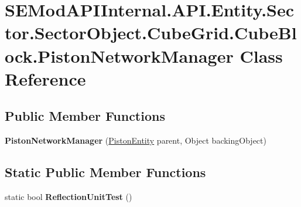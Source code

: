 \hypertarget{class_s_e_mod_a_p_i_internal_1_1_a_p_i_1_1_entity_1_1_sector_1_1_sector_object_1_1_cube_grid_1_125d4a251862e95777b41b851d1ed7712}{}\section{S\+E\+Mod\+A\+P\+I\+Internal.\+A\+P\+I.\+Entity.\+Sector.\+Sector\+Object.\+Cube\+Grid.\+Cube\+Block.\+Piston\+Network\+Manager Class Reference}
\label{class_s_e_mod_a_p_i_internal_1_1_a_p_i_1_1_entity_1_1_sector_1_1_sector_object_1_1_cube_grid_1_125d4a251862e95777b41b851d1ed7712}
\subsection*{Public Member Functions}
\begin{DoxyCompactItemize}
\item 
\hypertarget{class_s_e_mod_a_p_i_internal_1_1_a_p_i_1_1_entity_1_1_sector_1_1_sector_object_1_1_cube_grid_1_125d4a251862e95777b41b851d1ed7712_affb5fb2f7ed81816613123358515a339}{}{\bfseries Piston\+Network\+Manager} (\hyperlink{class_s_e_mod_a_p_i_internal_1_1_a_p_i_1_1_entity_1_1_sector_1_1_sector_object_1_1_cube_grid_1_1_cube_block_1_1_piston_entity}{Piston\+Entity} parent, Object backing\+Object)\label{class_s_e_mod_a_p_i_internal_1_1_a_p_i_1_1_entity_1_1_sector_1_1_sector_object_1_1_cube_grid_1_125d4a251862e95777b41b851d1ed7712_affb5fb2f7ed81816613123358515a339}

\end{DoxyCompactItemize}
\subsection*{Static Public Member Functions}
\begin{DoxyCompactItemize}
\item 
\hypertarget{class_s_e_mod_a_p_i_internal_1_1_a_p_i_1_1_entity_1_1_sector_1_1_sector_object_1_1_cube_grid_1_125d4a251862e95777b41b851d1ed7712_a353d83cb4379a0b7b202f5d074831623}{}static bool {\bfseries Reflection\+Unit\+Test} ()\label{class_s_e_mod_a_p_i_internal_1_1_a_p_i_1_1_entity_1_1_sector_1_1_sector_object_1_1_cube_grid_1_125d4a251862e95777b41b851d1ed7712_a353d83cb4379a0b7b202f5d074831623}

\end{DoxyCompactItemize}
